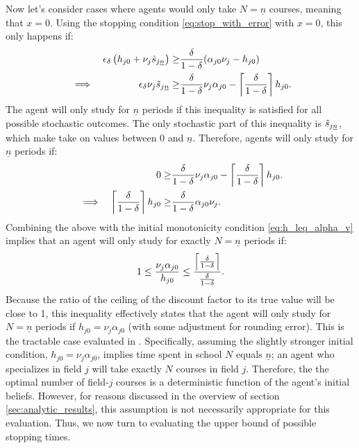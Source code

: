Now let's consider cases where agents would only take $N=\underline{n}$ courses, meaning that $x = 0$.
Using the stopping condition \eqref{eq:stop_with_error} with $x=0$, this only happens if:
\begin{alignat*}{3}
    &&
    \epsilon_\delta
    \pr{h_{j0} + \nu_j \ks[\underline{n}]} 
    \geq&
    \frac{\delta}{1 - \delta} 
    (\alpha_{j0} \nu_j - h_{j0})
    \\
    &\implies&
    \epsilon_\delta
    \nu_j \ks[\underline{n}]
    \geq&
    \frac{\delta}{1 - \delta} \nu_j \alpha_{j0} - \ddelta h_{j0}.
\end{alignat*}
The agent will only study for $\underline{n}$ periods if this inequality is satisfied for all possible stochastic outcomes. 
The only stochastic part of this inequality is $\ks[\underline{n}]$, which make take on values between 0 and $\underline{n}$.
Therefore, agents will only study for $\underline{n}$ periods if:
\begin{alignat*}{3}
    &&
    0
    \geq&
    \frac{\delta}{1 - \delta} \nu_j \alpha_{j0} - \ddelta h_{j0}.
    \\
    &\implies&
    \ddelta h_{j0} 
    \geq&
    \frac{\delta}{1 - \delta} \alpha_{j0} \nu_j.
 \end{alignat*}
 Combining the above with the initial monotonicity condition \eqref{eq:h_leq_alpha_v} implies that an agent will only study for exactly $N = \underline{n}$ periods if:
\begin{equation*}
    1 
    \leq 
    \frac{\nu_j \alpha_{j0}}{h_{j0}} 
    \leq
    \frac{\ddelta}{\frac{\delta}{1 - \delta}}.
\end{equation*}
Because the ratio of the ceiling of the discount factor to its true value will be close to 1, this inequality effectively states that the agent will only study for $N = \underline{n}$ periods if $h_{j0} = \nu_j \alpha_{j0}$ (with some adjustment for rounding error). 
This is the tractable case evaluated in \textcite{AF20}.
Specifically, assuming the slightly stronger initial condition, $h_{j0} = \nu_j \alpha_{j0}$, implies time spent in school $N$ equals $\underline{n}$; an agent who specializes in field $j$ will take exactly $N$ courses in field $j$.
Therefore, the the optimal number of field-$j$ courses is a deterministic function of the agent's initial beliefs.
However, for reasons discussed in the overview of section \ref{sec:analytic_results}, this assumption is not necessarily appropriate for this evaluation. 
Thus, we now turn to evaluating the upper bound of possible stopping times. 


